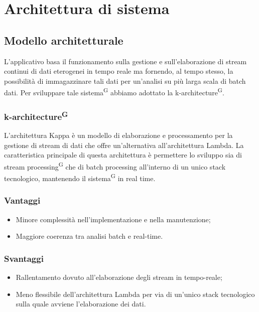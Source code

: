 \documentclass[8pt]{article}
\newcommand{\glossterm}[1]{#1\textsuperscript{G}} %
\begin{document}
\section{Architettura di sistema}\label{sec:arc}
\subsection{Modello architetturale}
L'applicativo basa il funzionamento sulla gestione e sull'elaborazione di stream continui di dati eterogenei in tempo reale ma fornendo, al tempo stesso, la possibilità di immagazzinare tali dati per un'analisi su più larga scala di batch dati. Per sviluppare tale \glossterm{sistema} abbiamo adottato la \glossterm{k-architecture}.
\subsubsection{\glossterm{k-architecture}}
L’architettura Kappa è un modello di elaborazione e processamento per la gestione di stream di dati che offre un’alternativa all’architettura Lambda. La caratteristica principale di questa architettura è permettere lo sviluppo sia di \glossterm{stream processing} che di batch processing all’interno di un unico stack tecnologico, mantenendo il \glossterm{sistema} in real time.
\subsubsection{Vantaggi}
\begin{itemize}
	\setlength\itemsep{0em}
    \item Minore complessità nell'implementazione e nella manutenzione;
    \item Maggiore coerenza tra analisi batch e real-time.
\end{itemize}
\subsubsection{Svantaggi}
\begin{itemize}
	\setlength\itemsep{0em}
    \item Rallentamento dovuto all'elaborazione degli stream in tempo-reale;
    \item Meno flessibile dell'architettura Lambda per via di un'unico stack tecnologico sulla quale avviene l'elaborazione dei dati.
\end{itemize}
\end{document}
